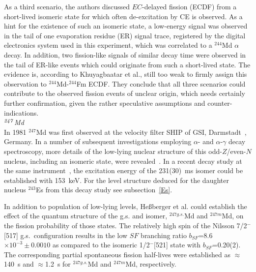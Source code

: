 As a third scenario, the authors discussed $EC$-delayed fission (ECDF) from a short-lived isomeric state for which often de-excitation by CE is observed. 
As a hint for the existence of such an isomeric state, a low-energy signal was observed in the tail of one evaporation residue (ER) signal trace, registered by the digital electronics system used in this experiment, which was correlated to a $^{244}$Md $\alpha$ decay.
In addition, two fission-like signals of similar decay time were observed in the tail of ER-like events which could originate from such a short-lived state. 
The evidence is, according to Khuyagbaatar et al., still too weak to firmly assign this observation to $^{244}$Md-$^{244}$Fm ECDF. They conclude that all three scenarios could contribute to the observed fission events of unclear origin, which needs certainly further confirmation, given the rather speculative assumptions and counter-indications.\\

{\it $^{\it247}$Md}\\
In 1981 $^{247}$Md was first observed at the velocity filter SHIP of GSI, Darmstadt~\cite{Muenzenberg1981}, Germany. 
In a number of subsequent investigations employing $\alpha$- and $\alpha$-$\gamma$ decay spectroscopy, more details of the low-lying nuclear structure of this odd-$Z$/even-$N$ nucleus, including an isomeric state, were revealed~\cite{Hofmann1994,Hessberger2005,Antalic2010}. 
In a recent decay study at the same instrument~\cite{Hessberger2022}, the excitation energy of the 231(30)~ms isomer could be established with 153~keV. 
For the level structure deduced for the daughter nucleus $^{243}$Es from this decay study see subsection~\ref{Es}.

In addition to population of low-lying levels, He{\ss}berger et al. could establish the effect of the quantum structure of the g.s. and isomer, $^{247g.s.}$Md and $^{247m}$Md, on the fission probability of those states. 
The relatively high spin of the Nilsson 7/2$^-$[517] g.s.~configuration results in the low $SF$ branching ratio $b_{SF}$=8.6$\times10^{-3}\pm0.0010$ as compared to the isomeric 1/2$^-$[521] state with $b_{SF}$=0.20(2). 
The corresponding partial spontaneous fission half-lives were established as $\approx$140~s and $\approx$1.2~s for $^{247g.s.}$Md and $^{247m}$Md, respectively.\\

